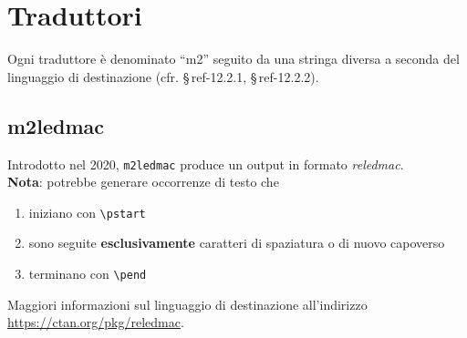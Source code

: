 \section{Traduttori}
\label{ref-12.2}

Ogni traduttore {\`e} denominato ``m2'' seguito da una stringa diversa a seconda del linguaggio di destinazione (cfr. \S\,{ref-12.2.1}, \S\,{ref-12.2.2}).

\subsection{m2ledmac}
\label{ref-12.2.1}

Introdotto nel 2020, \verb"m2ledmac" produce un output in formato \textit{reledmac}.\\ \textbf{Nota}: potrebbe generare occorrenze di testo che 
\begin{enumerate}
\item iniziano con \verb"\pstart"
\item sono seguite \textbf{esclusivamente} caratteri di spaziatura o di nuovo capoverso
\item terminano con \verb"\pend"
\end{enumerate}

\noindent Maggiori informazioni sul linguaggio di destinazione all'indirizzo \url{https://ctan.org/pkg/reledmac}.

